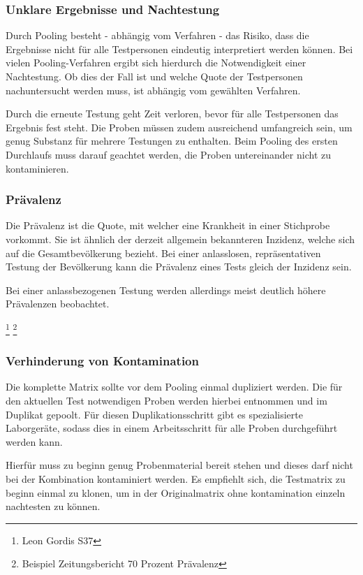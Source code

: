 \subsubsection{Unklare Ergebnisse und Nachtestung}
Durch Pooling besteht - abhängig vom Verfahren - das Risiko, dass die Ergebnisse nicht für alle Testpersonen eindeutig interpretiert werden können.
Bei vielen Pooling-Verfahren ergibt sich hierdurch die Notwendigkeit einer Nachtestung.
Ob dies der Fall ist und welche Quote der Testpersonen nachuntersucht werden muss, ist abhängig vom gewählten Verfahren.

Durch die erneute Testung geht Zeit verloren, bevor für alle Testpersonen das Ergebnis fest steht.
Die Proben müssen zudem ausreichend umfangreich sein, um genug Substanz für mehrere Testungen zu enthalten.
Beim Pooling des ersten Durchlaufs muss darauf geachtet werden, die Proben untereinander nicht zu kontaminieren.

\subsubsection{Prävalenz}
Die Prävalenz ist die Quote, mit welcher eine Krankheit in einer Stichprobe vorkommt.
Sie ist ähnlich der derzeit allgemein bekannteren Inzidenz, welche sich auf die Gesamtbevölkerung bezieht.
Bei einer anlasslosen, repräsentativen Testung der Bevölkerung kann die Prävalenz eines Tests gleich der Inzidenz sein.

Bei einer anlassbezogenen Testung werden allerdings meist deutlich höhere Prävalenzen beobachtet.

\footnote{Leon Gordis S37}
\footnote{Beispiel Zeitungsbericht 70 Prozent Prävalenz}


\subsubsection{Verhinderung von Kontamination}
Die komplette Matrix sollte vor dem Pooling einmal dupliziert werden. 
Die für den aktuellen Test notwendigen Proben werden hierbei entnommen und im Duplikat gepoolt.
Für diesen Duplikationsschritt gibt es spezialisierte Laborgeräte, sodass dies in einem Arbeitsschritt für alle Proben durchgeführt werden kann.

Hierfür muss zu beginn genug Probenmaterial bereit stehen und dieses darf nicht bei der Kombination kontaminiert werden.
Es empfiehlt sich, die Testmatrix zu beginn einmal zu klonen, um in der Originalmatrix ohne kontamination einzeln nachtesten zu können.

